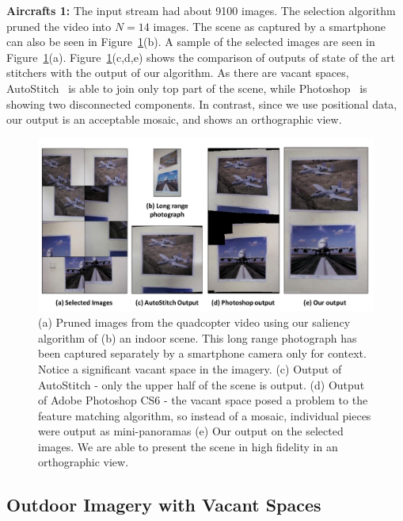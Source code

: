 \textbf{Aircrafts 1:} The input stream had about 9100 images. The selection
algorithm pruned the video into $N=14$ images. The scene as captured by a
smartphone can also be seen in Figure~\ref{fig:aircrafts1}(b). A sample of the
selected images are seen in Figure~\ref{fig:aircrafts1}(a).
Figure~\ref{fig:aircrafts1}(c,d,e) shows the comparison of outputs of state of
the art stitchers with the output of our algorithm. As there are vacant spaces,
AutoStitch~\cite{autostitch} is able to join only top part of the scene, while
Photoshop~\cite{photoshop} is showing two disconnected components.
In contrast, since we use positional data, our output is an acceptable mosaic,
and shows an orthographic view.

\begin{figure}[h!]
	\centering
	\includegraphics[width=\linewidth]{figures/vacantSpaces/aircrafts1}
	\caption[Result: Aircrafts]{(a) Pruned images from the quadcopter video using
	our saliency algorithm of (b) an indoor scene. This long range photograph has been captured separately by a smartphone camera only for context. Notice a significant vacant
space in the imagery. (c) Output of AutoStitch - only the upper half of the scene is output. (d) Output of Adobe Photoshop CS6 - 
the vacant space posed a problem to the feature matching algorithm, so instead of a mosaic, individual pieces were output as mini-panoramas (e) Our output on the
selected images. We are able to present the scene in high fidelity in an orthographic view.}
	\label{fig:aircrafts1}
\end{figure}

\subsection{Outdoor Imagery with Vacant Spaces}

